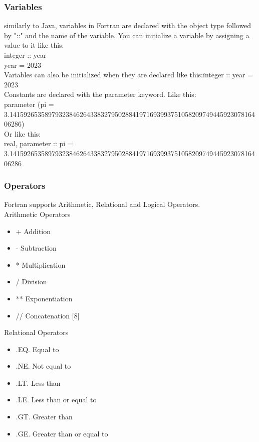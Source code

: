 \documentclass[12pt,a4paper]{scrartcl}
\begin{document}
\subsubsection{Variables}
similarly to Java, variables in Fortran are declared with the object type followed by "::" and the name of the variable.
You can initialize a variable by assigning a value to it like this:\\
integer :: year\\
year = 2023\\
Variables can also be initialized when they are declared like this:\"integer :: year = 2023\"\\
Constants are declared with the parameter keyword. Like this:\\
parameter (pi = 3.141592653589793238462643383279502884197169399375105820974944592307816406286)\\%
Or like this:\\
real, parameter :: pi = 3.141592653589793238462643383279502884197169399375105820974944592307816406286\\

\subsubsection{Operators}
Fortran supports Arithmetic, Relational and Logical Operators.\\

Arithmetic Operators
\begin{itemize}
\item + Addition
\item - Subtraction
\item * Multiplication
\item / Division
\item ** Exponentiation
\item // Concatenation [8]
\end{itemize}

Relational Operators
\begin{itemize}
\item .EQ. Equal to
\item .NE. Not equal to
\item .LT. Less than
\item .LE. Less than or equal to
\item .GT. Greater than
\item .GE. Greater than or equal to
\end{itemize}
\end{document}
